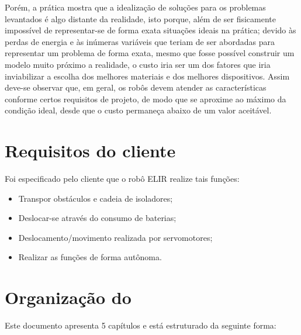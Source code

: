 Porém, a prática mostra que a idealização de soluções para os problemas levantados é algo distante da realidade, isto porque, além de ser fisicamente impossível de representar-se de forma exata situações ideais na prática; devido às perdas de energia e às inúmeras variáveis que teriam de ser abordadas para representar um problema de forma exata, mesmo que fosse possível construir um modelo muito próximo a realidade, o custo iria ser um dos fatores que iria inviabilizar a escolha dos melhores materiais e dos melhores dispositivos. Assim deve-se observar que, em geral, os robôs devem atender as características conforme certos requisitos de projeto, de modo que se aproxime ao máximo da condição ideal, desde que o custo permaneça abaixo de um valor aceitável. 


\section{Requisitos do cliente}
\label{sec:reqc}
Foi especificado pelo cliente que o robô ELIR realize tais funções:

\begin{itemize}
	
	\item Transpor obstáculos e cadeia de isoladores;
	\item Deslocar-se através do consumo de baterias;
	\item Deslocamento/movimento realizada por servomotores;
	\item Realizar as funções de forma autônoma.
	
\end{itemize}




\section{Organização do \thetypework}
\label{section:organizacao}

Este documento apresenta 5 capítulos e está estruturado da seguinte forma:

